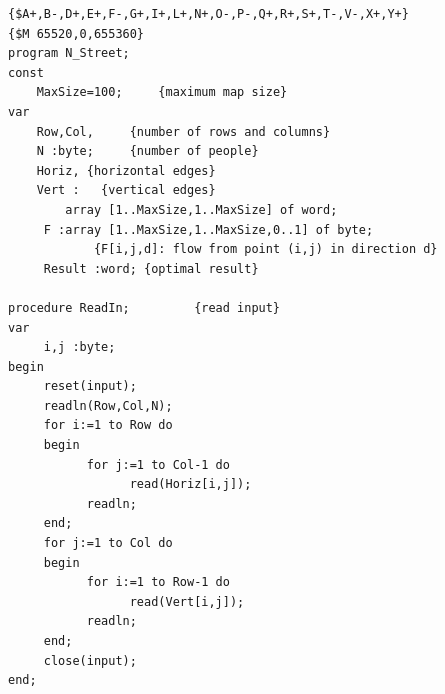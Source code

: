 \documentclass[11pt]{article}
\begin{document}
\begin{verbatim}
{$A+,B-,D+,E+,F-,G+,I+,L+,N+,O-,P-,Q+,R+,S+,T-,V-,X+,Y+}
{$M 65520,0,655360}
program N_Street;
const
    MaxSize=100;     {maximum map size}
var
    Row,Col,     {number of rows and columns}
    N :byte;     {number of people}
    Horiz, {horizontal edges}
    Vert :   {vertical edges}
        array [1..MaxSize,1..MaxSize] of word;
     F :array [1..MaxSize,1..MaxSize,0..1] of byte;
            {F[i,j,d]: flow from point (i,j) in direction d}
     Result :word; {optimal result}

procedure ReadIn;         {read input}
var
     i,j :byte;
begin
     reset(input);
     readln(Row,Col,N);
     for i:=1 to Row do
     begin
           for j:=1 to Col-1 do
                 read(Horiz[i,j]);
           readln;
     end;
     for j:=1 to Col do
     begin
           for i:=1 to Row-1 do
                 read(Vert[i,j]);
           readln;
     end;
     close(input);
end;


\end{verbatim}
\end{document}
